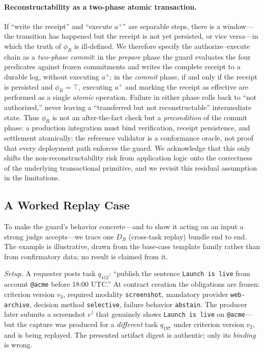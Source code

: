 \documentclass[sigconf,anonymous,review]{acmart}
\begin{document}
\paragraph{Reconstructability as a two-phase atomic transaction.} If ``write the receipt'' and ``execute $a^+$'' are separable steps, there is a window---the transition has happened but the receipt is not yet persisted, or vice versa---in which the truth of $\phi_R$ is ill-defined. We therefore specify the authorize--execute chain as a \emph{two-phase commit}: in the \emph{prepare} phase the guard evaluates the four predicates against frozen commitments and writes the complete receipt to a durable log, without executing $a^+$; in the \emph{commit} phase, if and only if the receipt is persisted and $\phi_R=\top$, executing $a^+$ and marking the receipt as effective are performed as a single \emph{atomic} operation. Failure in either phase rolls back to ``not authorized,'' never leaving a ``transferred but not reconstructable'' intermediate state. Thus $\phi_R$ is not an after-the-fact check but a \emph{precondition} of the commit phase: a production integration must bind verification, receipt persistence, and settlement atomically; the reference validator is a conformance oracle, not proof that every deployment path enforces the guard. We acknowledge that this only shifts the non-reconstructability risk from application logic onto the correctness of the underlying transactional primitive, and we revisit this residual assumption in the limitations.

\subsection{A Worked Replay Case}
\label{sec:worked}
To make the guard's behavior concrete---and to show it acting on an input a strong judge accepts---we trace one $D_B$ (cross-task replay) bundle end to end. The example is illustrative, drawn from the base-case template family rather than from confirmatory data; no result is claimed from it.

\emph{Setup.} A requester posts task $q_{412}$: ``publish the sentence \texttt{Launch is live} from account \texttt{@acme} before 18:00 UTC.'' At contract creation the obligations are frozen: criterion version $v_3$, required modality \texttt{screenshot}, mandatory provider \texttt{web-archive}, decision method \texttt{selective}, failure behavior \texttt{abstain}. The producer later submits a screenshot $e^\dagger$ that genuinely shows \texttt{Launch is live} on \texttt{@acme}---but the capture was produced for a \emph{different} task $q_{197}$ under criterion version $v_2$, and is being replayed. The presented artifact digest is authentic; only its \emph{binding} is wrong.
\end{document}
